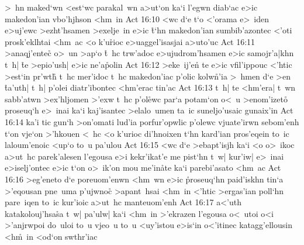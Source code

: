 >~hn
maked`wn
<est`wc
parakal~wn
a>ut`on
ka`i
l'egwn
diab`ac
e>ic
makedon'ian
vbo'hjhson
<hm~in\bibvsend
\vs Act 16:10
<wc
d`e
t`o
<'orama
e>~iden
e>uj'ewc
>ezht'hsamen
>exelje~in
e>ic
\r{t}`hn
makedon'ian
sumbib'azontec
<'oti
prosk'eklhtai
<hm~ac
<o
k'u\r{r}ioc
e>uaggel'isasjai
a>uto'uc\bibvsend
\vs Act 16:11
>anaqj'entec\r{}
o>~un
>ap`o
\r{t}~hc
trw'adoc
e>ujudrom'hsamen
e>ic
samojr'a|khn
t~h|
\r{t}e
>epio'ush|
e>ic
ne'a\r{p}olin\bibvsend
{}
\vs Act 16:12
>eke~ij'en\r{}
te
e>ic
vfil'ippouc
<'htic
>est`in
pr'wth\r{}
t~hc
mer'idoc
t~hc
makedon'iac
p'olic
kolw\r{n}'ia
>~hmen
d`e
>en
\r{t}a'uth|
t~h|
p'olei
diatr'ibontec
<hm'erac
tin'ac\bibvsend
\vs Act 16:13
t~h|
te
<hm'era|
t~wn
sabb'atwn
>ex'hljomen
>'exw
t~hc
p'ol\r{e}wc
par`a
potam`on
o<~u
>enom'izeto\r{}
proseuq`h
e>~inai
ka`i
kaj'isantec
>elalo~umen
ta~ic
suneljo'usaic
gunaix'in\bibvsend
\vs Act 16:14
ka'i
tic
gun`h
>on'omati
lud'ia
porfur'opwlic
p'olewc
vjuate'irwn
sebom'enh
t`on
vje`on
>'hkouen
<~hc
<o
k'urioc
di'hnoixen
t`hn
kard'ian
pros'eqein
to~ic
laloum'enoic
<up`o
to~u
pa'ulou\bibvsend
\vs Act 16:15
<wc
d`e
>ebapt'isjh
ka`i
<o
o>~ikoc
a>ut~hc
parek'alesen
l'egousa
e>i
kekr'ikat'e
me
pist`hn
t~w|
kur'iw|
e>~inai
e>iselj'ontec
e>ic
t`on
o>~ik'on
mou
me'in\r{a}te
ka`i
parebi'asato
<hm~ac\bibvsend
\vs Act 16:16
>eg'eneto
d`e
poreuom'enwn
<hm~wn
e>ic
\r{p}roseuq`hn
paid'iskhn
tin`a
>'eqousan
pne~uma
p'ujwnoc\r{}
>apant~hsai
<hm~in
<'htic
>ergas'ian
poll`hn
pare~iqen
to~ic
kur'ioic
a>ut~hc
manteuom'enh\bibvsend
\vs Act 16:17
a<'uth
katakolouj'hsa\r{s}a
t~w|
pa'ulw|
ka`i
<hm~in
>'ekrazen
l'egousa
o<~utoi
o<i
>'anjrwpoi
do~uloi
to~u
vjeo~u
to~u
<uy'istou
e>is`in
o<'itinec
katagg'ellousin
<h\r{m}~in
<od`on
swthr'iac\bibvsend
